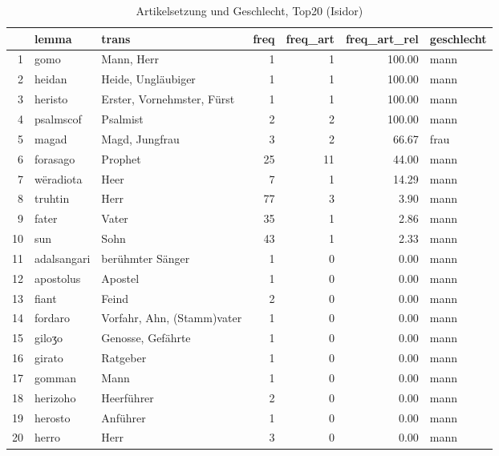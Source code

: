 \begin{table}[ht]
\centering
\begin{tabular}{rllrrrl}
  \hline
 & lemma & trans & freq & freq\_art & freq\_art\_rel & geschlecht \\ 
  \hline
1 & gomo & Mann, Herr &   1 &   1 & 100.00 & mann \\ 
  2 & heidan & Heide, Ungläubiger &   1 &   1 & 100.00 & mann \\ 
  3 & heristo & Erster, Vornehmster, Fürst &   1 &   1 & 100.00 & mann \\ 
  4 & psalmscof & Psalmist &   2 &   2 & 100.00 & mann \\ 
  5 & magad & Magd, Jungfrau &   3 &   2 & 66.67 & frau \\ 
  6 & forasago & Prophet &  25 &  11 & 44.00 & mann \\ 
  7 & wëradiota & Heer &   7 &   1 & 14.29 & mann \\ 
  8 & truhtin & Herr &  77 &   3 & 3.90 & mann \\ 
  9 & fater & Vater &  35 &   1 & 2.86 & mann \\ 
  10 & sun & Sohn &  43 &   1 & 2.33 & mann \\ 
  11 & adalsangari & berühmter Sänger &   1 &   0 & 0.00 & mann \\ 
  12 & apostolus & Apostel &   1 &   0 & 0.00 & mann \\ 
  13 & fiant & Feind &   2 &   0 & 0.00 & mann \\ 
  14 & fordaro & Vorfahr, Ahn, (Stamm)vater &   1 &   0 & 0.00 & mann \\ 
  15 & giloʒo & Genosse, Gefährte &   1 &   0 & 0.00 & mann \\ 
  16 & girato & Ratgeber &   1 &   0 & 0.00 & mann \\ 
  17 & gomman & Mann &   1 &   0 & 0.00 & mann \\ 
  18 & herizoho & Heerführer &   2 &   0 & 0.00 & mann \\ 
  19 & herosto & Anführer &   1 &   0 & 0.00 & mann \\ 
  20 & herro & Herr &   3 &   0 & 0.00 & mann \\ 
   \hline
\end{tabular}
\caption{Artikelsetzung und Geschlecht, Top20  (Isidor)} 
\end{table}
